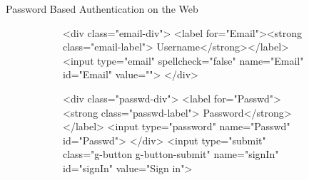 \documentclass[notes]{beamer}
\begin{document}
\begin{frame}[fragile]{Password Based Authentication on the Web}{}
\begin{figure}
\begin{subfigure}[t]{0.5\textwidth}
\begin{listing}
\begin{spverbatim}
<div class="email-div">
  <label for="Email"><strong class="email-label"> Username</strong></label>
  <input type="email" spellcheck="false" name="Email" id="Email" value="">
</div>
  
<div class="passwd-div">
  <label for="Passwd"><strong class="passwd-label"> Password</strong></label>
  <input type="password" name="Passwd" id="Passwd">
</div>
<input type="submit" class="g-button g-button-submit" name="signIn" id="signIn" value="Sign in">
\end{spverbatim}
\end{listing}
\end{subfigure}

\end{figure}

\end{frame}

%
%		
%	
%
%	
%
%
\end{document}

